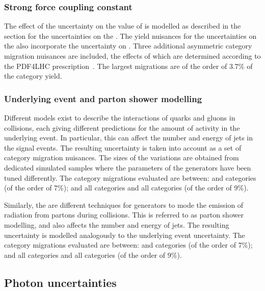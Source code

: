\subsubsection{Strong force coupling constant}
The effect of the uncertainty on the value of \alphaS is modelled as described in the section for the uncertainties on the \PDF\s. The yield nuisances for the uncertainties on the \PDF\s also incorporate the uncertainty on \alphaS. Three additional asymmetric category migration nuisances are included, the effects of which are determined according to the PDF4LHC prescription~\cite{Demartin:2010er}. The largest migrations are of the order of $3.7\%$ of the category yield. 

\subsubsection{Underlying event and parton shower modelling}
Different models exist to describe the interactions of quarks and gluons in \pp collisions, each giving different predictions for the amount of activity in the underlying event. In particular, this can affect the number and energy of jets in the signal events. The resulting uncertainty is taken into account as a set of category migration nuisances. The sizes of the variations are obtained from dedicated simulated samples where the parameters of the generators have been tuned differently. The category migrations evaluated are between:  and  categories (of the order of 7\%); and all \VBFTag categories and all \Untagged categories (of the order of 9\%).

Similarly, the are different techniques for generators to mode the emission of \QCD radiation from partons during \pp collisions. This is referred to as parton shower modelling, and also affects the number and energy of jets. The resulting uncertainty is modelled analogously to the underlying event uncertainty. The category migrations evaluated are between:  and  categories (of the order of 7\%); and all \VBFTag categories and all \Untagged categories (of the order of 9\%).


\subsection{Photon uncertainties}

